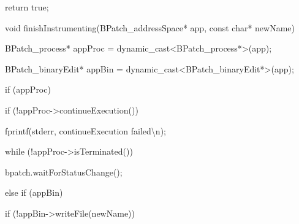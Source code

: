 {{{{{{{{{return true;}



{

}}





\bigskip



{

void finishInstrumenting(BPatch_addressSpace* app, const char* newName)}



{

{}



{

BPatch_process* appProc = dynamic_cast<BPatch_process*>(app);}



{

BPatch_binaryEdit* appBin = dynamic_cast<BPatch_binaryEdit*>(app);}





\bigskip



{

if (appProc) {}



{

if (!appProc->continueExecution()) {}



{

fprintf(stderr, {\textquotedbl}continueExecution failed{\textbackslash}n{\textquotedbl});}



{

}}



{

while (!appProc->isTerminated()) {}



{

bpatch.waitForStatusChange();}



{

}}



{

} else if (appBin) {}



{

if (!appBin->writeFile(newName)) {}



}}}}}}}}}}

